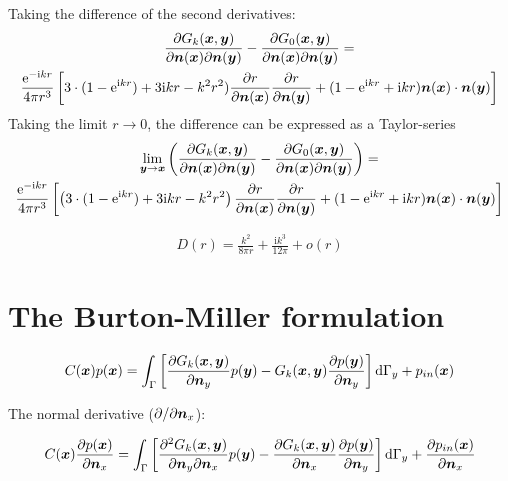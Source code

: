 \documentclass[a4paper, 10pt]{article}
\newcommand{\te}{\mathrm{e}}
\newcommand{\ti}{\mathrm{i}}
\newcommand{\td}{\mathrm{d}}
\newcommand{\tn}{\bm{\mathnormal{n}}}
\newcommand{\tx}{\bm{\mathnormal{x}}}
\newcommand{\ty}{\bm{\mathnormal{y}}}
\newcommand{\sx}{\bm{\mathnormal{x}}}
\newcommand{\sy}{\bm{\mathnormal{y}}}
\newcommand{\sn}{\bm{\mathnormal{n}}}
\begin{document}
Taking the difference of the second derivatives:
%
\begin{multline}
	\frac{\partial G_k(\tx, \ty)}{\partial \tn(\tx) \partial \tn(\ty)} - \frac{\partial G_0(\tx, \ty)}{\partial \tn(\tx) \partial \tn(\ty)} = \\
	\frac{\te^{- \ti kr}}{4 \pi r^3}\left[3 \cdot (1 - \te^{\ti kr}) + 3 \ti kr - k^2 r^2) \frac{\partial r}{\partial \tn(\tx)}\frac{\partial r}{\partial \tn(\ty)} + (1 - \te^{\ti kr} + \ti kr) \tn(\tx) \cdot \tn (\ty) \right]
\end{multline}
%
Taking the limit $r \rightarrow 0$, the difference can be expressed as a Taylor-series
%
\begin{multline}
	\lim\limits_{\sy \rightarrow \sx} \left(\frac{\partial G_k(\tx, \ty)}{\partial \tn(\tx) \partial \tn(\ty)} - \frac{\partial G_0(\tx, \ty)}{\partial \tn(\tx) \partial \tn(\ty)}\right) = \\
	\frac{\te^{- \ti kr}}{4 \pi r^3}
	\left[\left(3 \cdot (1 - \te^{\ti kr}) + 3 \ti kr - k^2 r^2\right) \frac{\partial r}{\partial \tn(\tx)}\frac{\partial r}{\partial \tn(\ty)} + (1 - \te^{\ti kr} + \ti kr) \tn(\tx) \cdot \tn (\ty) \right]
\end{multline}

\begin{align}
	D(r) = \frac{k^2}{8 \pi r} + \frac{\ti k^3}{12 \pi} + o(r)
\end{align}



\section{The Burton-Miller formulation}

\begin{equation}
	C(\sx) p (\sx) = \int_{\Gamma}\left[\frac{\partial{G}_k (\sx, \sy)}{\partial \sn_y} p(\sy)
	- G_k(\sx,\sy)\frac{\partial p(\sy)}{\partial \sn_y}\right] \td \Gamma_y + p_{in}(\sx)
\end{equation}

The normal derivative ($ \partial / \partial \sn_x$):

\begin{equation}
	C(\sx) \frac{\partial p(\sx)}{\partial \sn_x}
	=
	\int_{\Gamma}\left[\frac{\partial^2{G}_k (\sx, \sy)}{\partial \sn_y \partial \sn_x} p(\sy) - \frac{\partial G_k(\sx,\sy)}{\partial \sn_x}\frac{\partial p(\sy)}{\partial \sn_y}\right] \td \Gamma_y + \frac{\partial p_{in}(\sx)}{\partial \sn_x}
\end{equation}
\end{document}
